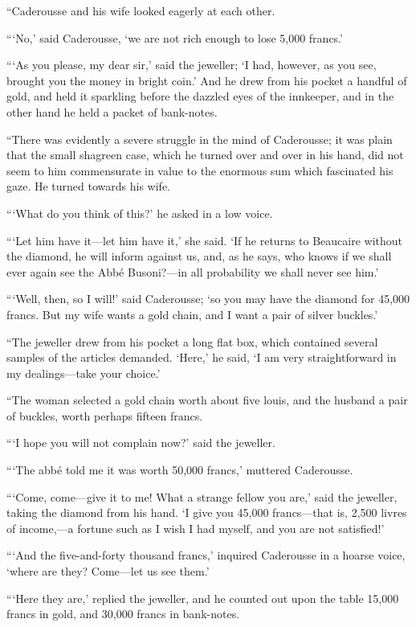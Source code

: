 “Caderousse and his wife looked eagerly at each other.

“‘No,’ said Caderousse, ‘we are not rich enough to lose 5,000 francs.’

“‘As you please, my dear sir,’ said the jeweller; ‘I had, however, as
you see, brought you the money in bright coin.’ And he drew from his
pocket a handful of gold, and held it sparkling before the dazzled eyes
of the innkeeper, and in the other hand he held a packet of bank-notes.

“There was evidently a severe struggle in the mind of Caderousse; it
was plain that the small shagreen case, which he turned over and over
in his hand, did not seem to him commensurate in value to the enormous
sum which fascinated his gaze. He turned towards his wife.

“‘What do you think of this?’ he asked in a low voice.

“‘Let him have it—let him have it,’ she said. ‘If he returns to
Beaucaire without the diamond, he will inform against us, and, as he
says, who knows if we shall ever again see the Abbé Busoni?—in all
probability we shall never see him.’

“‘Well, then, so I will!’ said Caderousse; ‘so you may have the diamond
for 45,000 francs. But my wife wants a gold chain, and I want a pair of
silver buckles.’

“The jeweller drew from his pocket a long flat box, which contained
several samples of the articles demanded. ‘Here,’ he said, ‘I am very
straightforward in my dealings—take your choice.’

“The woman selected a gold chain worth about five louis, and the
husband a pair of buckles, worth perhaps fifteen francs.

“‘I hope you will not complain now?’ said the jeweller.

“‘The abbé told me it was worth 50,000 francs,’ muttered Caderousse.

“‘Come, come—give it to me! What a strange fellow you are,’ said the
jeweller, taking the diamond from his hand. ‘I give you 45,000
francs—that is, 2,500 livres of income,—a fortune such as I wish I had
myself, and you are not satisfied!’

“‘And the five-and-forty thousand francs,’ inquired Caderousse in a
hoarse voice, ‘where are they? Come—let us see them.’

“‘Here they are,’ replied the jeweller, and he counted out upon the
table 15,000 francs in gold, and 30,000 francs in bank-notes.

